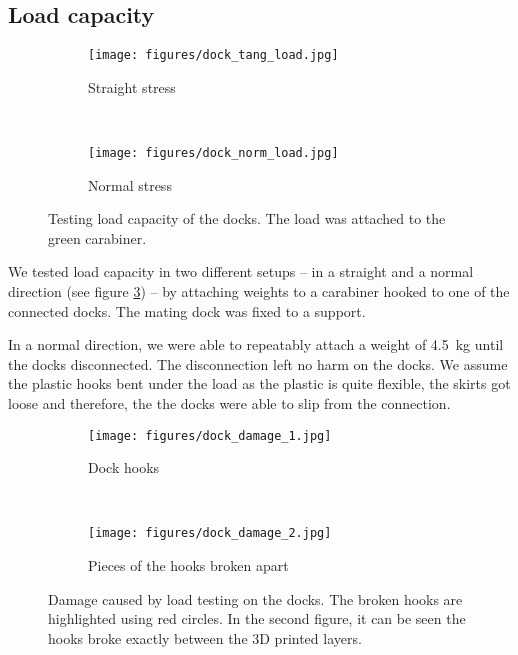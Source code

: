 \subsection{Load capacity}

\begin{figure}[t!]
    \centering
    \begin{subfigure}[b]{0.45\textwidth}
        \texttt{[image: figures/dock\_tang\_load.jpg]}
        \caption{Straight stress}
        \label{fig:dock_test_tang}
    \end{subfigure}
    ~
    \begin{subfigure}[b]{0.45\textwidth}
        \texttt{[image: figures/dock\_norm\_load.jpg]}
        \caption{Normal stress}
        \label{fig:dock_test_norm}
    \end{subfigure}
    \caption{Testing load capacity of the docks. The load was attached to the
    green carabiner.}
    \label{fig:dock_test_load}
\end{figure}

We tested load capacity in two different setups -- in a straight and a normal
direction (see figure \ref{fig:dock_test_load}) -- by attaching weights to a
carabiner hooked to one of the connected docks. The mating dock was fixed to a
support.

In a normal direction, we were able to repeatably attach a weight of 4.5~kg
until the docks disconnected. The disconnection left no harm on the docks. We
assume the plastic hooks bent under the load as the plastic is quite flexible,
the skirts got loose and therefore, the the docks were able to slip from the
connection.

\begin{figure}[t!]
    \centering
    \begin{subfigure}[b]{0.45\textwidth}
        \texttt{[image: figures/dock\_damage\_1.jpg]}
        \caption{Dock hooks}
    \end{subfigure}
    ~
    \begin{subfigure}[b]{0.45\textwidth}
        \texttt{[image: figures/dock\_damage\_2.jpg]}
        \caption{Pieces of the hooks broken apart}
    \end{subfigure}
    \caption{Damage caused by load testing on the docks. The broken hooks are
    highlighted using red circles. In the second figure, it can be seen the
    hooks broke exactly between the 3D printed layers.}
    \label{fig:dock_damage}
\end{figure}

